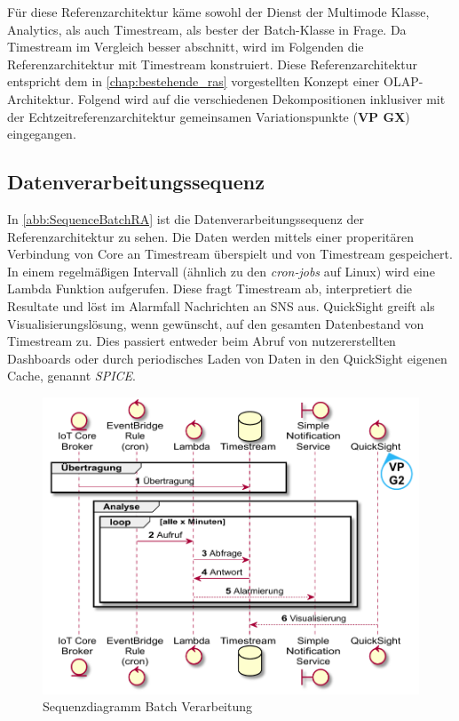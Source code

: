 Für diese Referenzarchitektur käme sowohl der Dienst der Multimode Klasse, \AWSIOT{} Analytics, als auch Timestream, als bester der Batch-Klasse in Frage. Da Timestream im Vergleich besser abschnitt, wird im Folgenden die Referenzarchitektur mit Timestream konstruiert.
Diese Referenzarchitektur entspricht dem in \autoref{chap:bestehende_ras} vorgestellten Konzept einer \ac{OLAP}-Architektur. Folgend wird auf die verschiedenen Dekompositionen inklusiver mit der Echtzeitreferenzarchitektur gemeinsamen Variationspunkte (\textbf{VP GX}) eingegangen.

\subsection{Datenverarbeitungssequenz}
In \autoref{abb:SequenceBatchRA} ist die Datenverarbeitungssequenz der Referenzarchitektur zu sehen. Die Daten werden mittels einer properitären Verbindung von \AWSIOT{} Core an Timestream überspielt und von Timestream gespeichert. In einem regelmäßigen Intervall (ähnlich zu den \textit{cron-jobs} auf Linux) wird eine Lambda Funktion aufgerufen. Diese fragt Timestream ab, interpretiert die Resultate und löst im Alarmfall Nachrichten an \ac{SNS} aus. QuickSight greift als Visualisierungslösung, wenn gewünscht, auf den gesamten Datenbestand von Timestream zu. Dies passiert entweder beim Abruf von nutzererstellten Dashboards oder durch periodisches Laden von Daten in den QuickSight eigenen Cache, genannt \textit{SPICE}.
\begin{figure}[H]
\centering
\includegraphics[height=0.38\textheight]{graphics/batch-ra.pdf}
\caption{Sequenzdiagramm Batch Verarbeitung}
\label{abb:SequenceBatchRA}
\end{figure}

